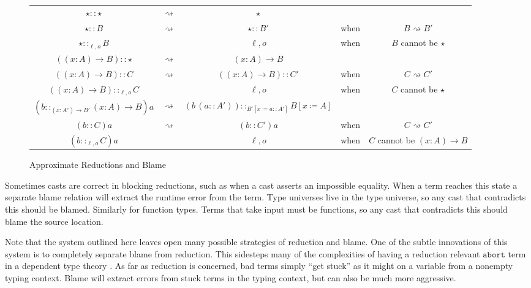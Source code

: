 \begin{sidewaysfigure}
\begin{tabular}{ccccc}
$\star::\star$ & $\rightsquigarrow$ & $\star$ &  & \tabularnewline
$\star::B$ & $\rightsquigarrow$ & $\star::B'$ & when  & $B\rightsquigarrow B'$\tabularnewline
$\star::_{\ell,o}B$ & \Blame{} & $\ell,o$ & when  & $B$ cannot be $\star$ \tabularnewline
$\left(\left(x:A\right)\rightarrow B\right)::\star$ & $\rightsquigarrow$ & $\left(x:A\right)\rightarrow B$ &  & \tabularnewline
$\left(\left(x:A\right)\rightarrow B\right)::C$ & $\rightsquigarrow$ & $\left(\left(x:A\right)\rightarrow B\right)::C'$ & when  & $C\rightsquigarrow C'$\tabularnewline
$\left(\left(x:A\right)\rightarrow B\right)::_{\ell,o}C$ & \Blame{} & $\ell,o$ & when  & $C$ cannot be $\star$ \tabularnewline
$\left(b::_{\left(x:A'\right)\rightarrow B'}\left(x:A\right)\rightarrow B\right)a$ & $\rightsquigarrow$ & $\left(b\,\left(a::A'\right)\right)::_{B'\left[x\coloneqq a::A'\right]}B\left[x\coloneqq A\right]$ &  & \tabularnewline
$\left(b::C\right)a$ & $\rightsquigarrow$ & $\left(b::C'\right)a$ & when  & $C\rightsquigarrow C'$\tabularnewline
$\left(b::_{\ell,o}C\right)a$ & \Blame{} & $\ell,o$ & when  & $C$ cannot be $\left(x:A\right)\rightarrow B$ \tabularnewline
\end{tabular}

\caption{Approximate \CLang{} Reductions and Blame}
\label{fig:cast-aprox-red}
\end{sidewaysfigure}

Sometimes casts are correct in blocking reductions, such as when a cast asserts an impossible equality.
When a term reaches this state a separate blame relation will extract the runtime error from the term.
Type universes live in the type universe, so any cast that contradicts this should be blamed.
Similarly for function types.
Terms that take input must be functions, so any cast that contradicts this should blame the source location.

Note that the system outlined here leaves open many possible strategies of reduction and blame.
One of the subtle innovations of this system is to completely separate blame from reduction.
This sidesteps many of the complexities of having a reduction relevant $\mathtt{abort}$ term in a dependent type theory \cite{sjoberg2012irrelevance,pedrot2018failure}.
As far as reduction is concerned, bad terms simply ``get stuck'' as it might on a variable from a nonempty typing context.
Blame will extract errors from stuck terms in the typing context, but can also be much more aggressive. 

